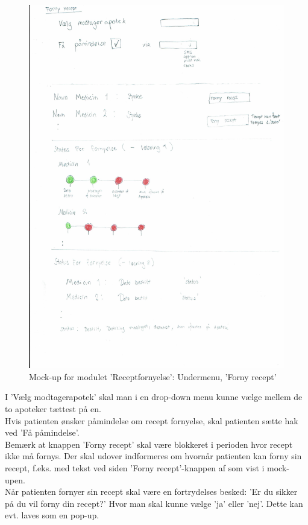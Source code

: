 \begin{figure}[H]
	\centering
	\includegraphics[angle=0, width=\linewidth]{Materials/FornyRecept.pdf}
	\caption{Mock-up for modulet 'Receptfornyelse': Undermenu, 'Forny recept'}
	\label{fig:Mock-Up2}
\end{figure}
I 'Vælg modtagerapotek' skal man i en drop-down menu kunne vælge mellem de to apoteker tættest på en.\\
Hvis patienten ønsker påmindelse om recept fornyelse, skal patienten sætte hak ved 'Få påmindelse'.\\
Bemærk at knappen 'Forny recept' skal være blokkeret i perioden hvor recept ikke må fornys. Der skal udover indformeres om hvornår patienten kan forny sin recept, f.eks. med tekst ved siden 'Forny recept'-knappen af som vist i mock-upen.\\
Når patienten fornyer sin recept skal være en fortrydelses besked: 'Er du sikker på du vil forny din recept?' Hvor man skal kunne vælge 'ja' eller 'nej'. Dette kan evt. laves som en pop-up. \\

